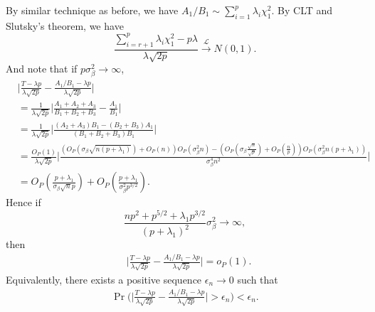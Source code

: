 \documentclass[review]{elsarticle}
\theoremstyle{plain}
\theoremstyle{definition}
\theoremstyle{remark}
\begin{document}
By similar technique as before, we have $A_1/B_1\sim \sum_{i=1}^p \lambda_i \chi^2_1$. By CLT and Slutsky's theorem, we have
\begin{equation}
    \frac{\sum_{i=r+1}^p \lambda_i \chi^2_1-p\lambda}{\lambda\sqrt{2p}}\xrightarrow{\mathcal{L}}N(0,1).
\end{equation}
And note that if $p \sigma_{\beta}^2\to \infty$,
\begin{equation}
    \begin{aligned}
        &\Big|\frac{T-{\lambda p}}{\lambda\sqrt{2p}
        }-
    \frac{{A_1}/{B_1}-{\lambda p}}{\lambda\sqrt{2p}
        }\Big|\\
        &=
        \frac{1}{\lambda\sqrt{2p}}
        \Big|
        \frac{A_1+A_2+A_3}{B_1+B_2+B_3}-\frac{A_1}{B_1}
        \Big|\\
        &=
        \frac{1}{\lambda\sqrt{2p}}
        \Big|
        \frac{(A_2+A_3)B_1-(B_2+B_3)A_1}{(B_1+B_2+B_3)B_1}
        \Big|\\
        &=
        \frac{O_{P}(1)}{\lambda\sqrt{2p}}
        \Big|
        \frac{(O_P(\sigma_{\beta}\sqrt{n(p+\lambda_1)})+O_P(n))O_P(\sigma^2_\beta n)-(O_P(\sigma_{\beta}\frac{\sqrt{n}}{\sqrt{p}})+O_P(\frac{n}{p}))O_P(\sigma^2_{\beta} n(p+\lambda_1))}{\sigma^4_{\beta}n^2}
        \Big|\\
        &=O_P(\frac{p+\lambda_1}{\sigma_{\beta}\sqrt{n}p})+O_P(\frac{p+\lambda_1}{\sigma^2_{\beta}p^{3/2}}).
    \end{aligned}
\end{equation}
Hence if 
\begin{equation}
    \frac{np^2+p^{5/2}+\lambda_1 p^{3/2}}{{(p+\lambda_1)}^2}\sigma^2_{\beta}\to \infty,
\end{equation}
then
\begin{equation}\label{proEps}
    \begin{aligned}
        &\Big|\frac{T-{\lambda p}}{\lambda\sqrt{2p}
        }-
    \frac{{A_1}/{B_1}-{\lambda p}}{\lambda\sqrt{2p}
        }\Big|=o_P(1).
    \end{aligned}
\end{equation}
Equivalently, there exists a positive sequence $\epsilon_n\to 0$ such that
\begin{equation}
    \begin{aligned}
        \Pr\Big(\Big|\frac{T-{\lambda p}}{\lambda\sqrt{2p}
        }-
    \frac{{A_1}/{B_1}-{\lambda p}}{\lambda\sqrt{2p}
        }\Big|>\epsilon_n\Big)< \epsilon_n.
    \end{aligned}
\end{equation}
\end{document}
